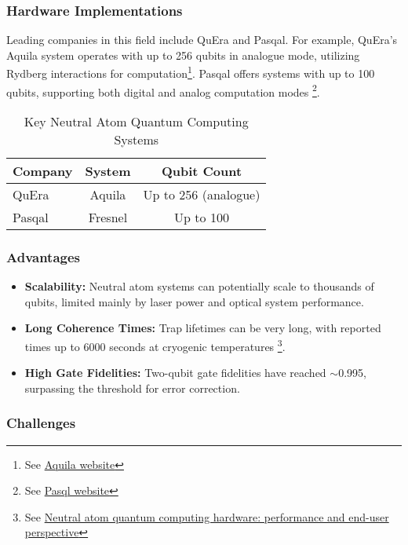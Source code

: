 \subsubsection*{Hardware Implementations}

Leading companies in this field include QuEra and Pasqal. For example,
QuEra's Aquila system operates with up to 256 qubits in analogue mode,
utilizing Rydberg interactions for computation\footnote{See
\href{https://www.quera.com/aquila}{Aquila website}}. Pasqal offers systems
with up to 100 qubits, supporting both digital and analog computation modes
\footnote{See \href{https://www.pasqal.com/hardware}{Pasql website}}.

\begin{table}[h]
  \centering
  \caption{Key Neutral Atom Quantum Computing Systems}
  \begin{tabular}{|l|c|c|}
    \hline
    \textbf{Company} & \textbf{System} & \textbf{Qubit Count} \\
    \hline
    QuEra & Aquila & Up to 256 (analogue) \\
    Pasqal & Fresnel & Up to 100 \\
    \hline
  \end{tabular}
\end{table}

\subsubsection*{Advantages}

\begin{itemize}
  \item \textbf{Scalability:} Neutral atom systems can potentially scale to
    thousands of qubits, limited mainly by laser power and optical system
    performance.
  \item \textbf{Long Coherence Times:} Trap lifetimes can be very long, with
    reported times up to 6000 seconds at cryogenic temperatures \footnote{See
    \href{https://epjquantumtechnology.springeropen.com/articles/10.1140/epjqt/s40507-023-00190-1}{Neutral atom quantum computing hardware: performance and end-user perspective}}.
  \item \textbf{High Gate Fidelities:} Two-qubit gate fidelities have reached
    $\sim$0.995, surpassing the threshold for error correction.
\end{itemize}

\subsubsection*{Challenges}

